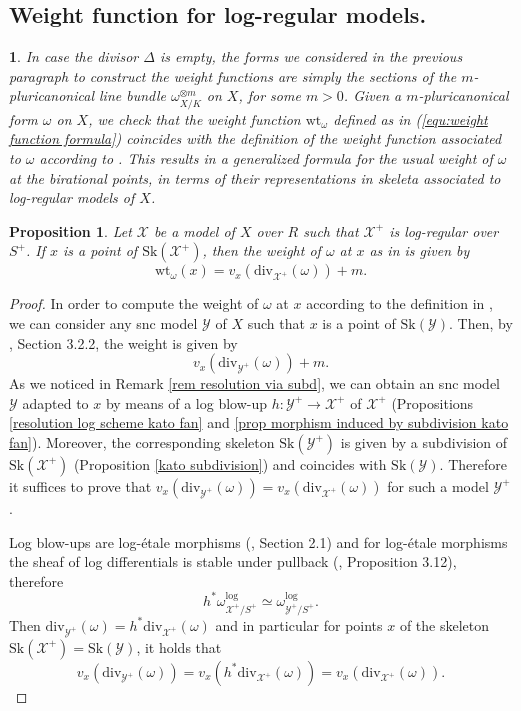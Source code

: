 \documentclass{amsart}%
\numberwithin{equation}{subsection}
\theoremstyle{plain2}
\newtheorem{prop}[equation]{Proposition}
\theoremstyle{definition2}
\theoremstyle{stepstyle}
\theoremstyle{point}
\theoremstyle{subpoint}
\newtheorem{subpoint}[equation]{}%
\newcommand{\spa}[1]{\begin{subpoint}#1\end{subpoint}}           %
\newcommand{\cX}{\ensuremath{\mathscr{X}}}
\newcommand{\cY}{\ensuremath{\mathscr{Y}}}
\renewcommand{\cY}{\ensuremath{\mathscr{Y}}}
\newcommand{\divisor}{\mathrm{div}}
\newcommand{\weight}{\mathrm{wt}}
\newcommand{\Sk}{\mathrm{Sk}}
\begin{document}
\subsection{Weight function for log-regular models.}
\spa{In case the divisor $\Delta$ is empty, the forms we considered in the previous paragraph to construct the weight functions are simply the sections of the $m$-pluricanonical line bundle $\omega_{X/K}^{\otimes m}$ on $X$, for some $m>0$. Given a $m$-pluricanonical form $\omega$ on $X$, we check that the weight function $\weight_{\omega}$ defined as in (\ref{equ:weight function formula}) coincides with the definition of the weight function associated to $\omega$ according to \cite{MustataNicaise}. This results in a generalized formula for the usual weight of $\omega$ at the birational points, in terms of their representations in skeleta associated to log-regular models of $X$.}

\begin{prop} \label{prop weight function log formula}
Let $\cX$ be a model of $X$ over $R$ such that $\cX^+$ is log-regular over $S^+$. If $x$ is a point of $\Sk(\cX^+)$, then the weight of $\omega$ at $x$ as in \cite{MustataNicaise} is given by $$\weight_{\omega}(x)=v_x(\divisor_{\cX^+}(\omega)) +m.$$
\end{prop}
\begin{proof}
In order to compute the weight of $\omega$ at $x$ according to the definition in \cite{MustataNicaise}, we can consider any snc model $\cY$ of $X$ such that $x$ is a point of $\Sk(\cY)$. Then, by \cite{NicaiseXu}, Section 3.2.2, the weight is given by $$v_x(\divisor_{\cY^+}(\omega))+m.$$
As we noticed in Remark \ref{rem resolution via subd}, we can obtain an snc model $\cY$ adapted to $x$ by means of a log blow-up $h: \cY^+ \rightarrow \cX^+$ of $\cX^+$ (Propositions \ref{resolution log scheme kato fan} and \ref{prop morphism induced by subdivision kato fan}). Moreover, the corresponding skeleton $\Sk(\cY^+)$ is given by a subdivision of $\Sk(\cX^+)$ (Proposition \ref{kato subdivision}) and coincides with $\Sk(\cY)$. Therefore it suffices to prove that $v_x(\divisor_{\cY^+}(\omega)) =   v_x(\divisor_{\cX^+}(\omega))$ for such a model $\cY^+$.

Log blow-ups are log-\'{e}tale morphisms (\cite{Saito2004}, Section 2.1) and for log-\'{e}tale morphisms the sheaf of log differentials is stable under pullback (\cite{Kato1994a}, Proposition 3.12), therefore $$h^* \omega_{\cX^+/ S^+}^{\text{log}} \simeq \omega_{\cY^+/S^+}^{\text{log}}.$$ Then $\divisor_{\cY^+}(\omega)=h^* \divisor_{\cX^+}(\omega)$ and in particular for points $x$ of the skeleton $\Sk(\cX^+) = \Sk(\cY)$, it holds that $$v_{x}(\divisor_{\cY^+}(\omega))= v_{x}(h^*\divisor_{\cX^+}(\omega))= v_x(\divisor_{\cX^+}(\omega)).$$
\end{proof}
\end{document}
